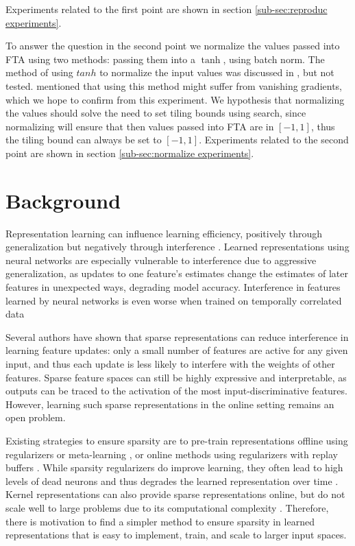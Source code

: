 \documentclass{article}
\begin{document}
Experiments related to the first point are shown in section \ref{sub-sec:reproduc experiments}. 

To answer the question in the second point we normalize the values passed into FTA using two methods: passing them into a $\tanh$, using batch norm.
The method of using $tanh$ to normalize the input values was discussed in \cite{pan2019fuzzy}, but not tested.
\cite{pan2019fuzzy} mentioned that using this method might suffer from vanishing gradients, which we hope to confirm from this experiment.
We hypothesis that normalizing the values should solve the need to set tiling bounds using search, since normalizing will ensure that then values passed into FTA are in $[-1, 1]$, thus the tiling bound can always be set to $[-1, 1]$.
Experiments related to the second point are shown in section \ref{sub-sec:normalize experiments}. 


\section{Background} \label{sec:background}
Representation learning can influence learning efficiency, positively through generalization but negatively through interference \cite[]{bullinaria1995, iCaRL2016, le2017, liu2019}.
Learned representations using neural networks are especially vulnerable to interference due to aggressive generalization, as updates to one feature’s estimates change the estimates of later features in unexpected ways, degrading model accuracy. 
Interference in features learned by neural networks is even worse when trained on temporally correlated data \cite[]{liu2020, bengio2020, zhang2022}

Several authors \cite[]{ghiassian2020, liu2019, javed2019, sutton2019;}
have shown that sparse representations can reduce interference in learning feature updates: only a small number of features are active for any given input, 
and thus each update is less likely to interfere with the weights of other features. Sparse feature spaces can still be highly expressive and interpretable, 
as outputs can be traced to the activation of the most input-discriminative features. 
However, learning such sparse representations in the online setting remains an open problem.

Existing strategies to ensure sparsity are to pre-train representations offline using regularizers \cite[]{liu2019} or meta-learning \cite{javed2019}, 
or online methods using regularizers with replay buffers \cite{sutton2019}. While sparsity regularizers do improve learning, 
they often lead to high levels of dead neurons and thus degrades the learned representation over time \cite[]{sutton2019}. 
Kernel representations can also provide sparse representations online, but do not scale well to large problems due to its computational complexity \cite[]{pan2019fuzzy}. 
Therefore, there is motivation to find a simpler method to ensure sparsity in learned representations that is easy to implement, train, and scale to larger input spaces.
\end{document}
